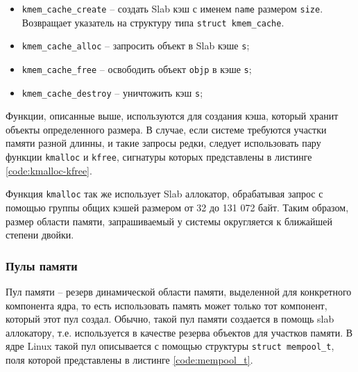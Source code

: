 \begin{itemize}
	\item \texttt{kmem\_cache\_create} -- создать Slab кэш с именем \texttt{name} размером \texttt{size}. Возвращает указатель на структуру типа \texttt{struct kmem\_cache}.
	\item \texttt{kmem\_cache\_alloc} -- запросить объект в Slab кэше \texttt{s};
	\item \texttt{kmem\_cache\_free} -- освободить объект \texttt{objp} в кэше \texttt{s};
	\item \texttt{kmem\_cache\_destroy} -- уничтожить кэш \texttt{s};
\end{itemize}

Функции, описанные выше, используются для создания кэша, который хранит объекты определенного размера. В случае, если системе требуются участки памяти разной длинны, и такие запросы редки, следует использовать пару функции \texttt{kmalloc} и  \texttt{kfree}, сигнатуры которых представлены в листинге \ref{code:kmalloc-kfree}. 


Функция \texttt{kmalloc} так же использует Slab аллокатор, обрабатывая запрос с помощью группы общих кэшей размером от 32 до 131 072 байт. Таким образом, размер области памяти, запрашиваемый у системы округляется к ближайшей степени двойки.

\subsubsection{Пулы памяти}

Пул памяти -- резерв динамической области памяти, выделенной для конкретного компонента ядра, то есть использовать память может только тот компонент, который этот пул создал. Обычно, такой пул памяти создается в помощь slab аллокатору, т.е. используется в качестве резерва объектов для участков памяти. В ядре Linux такой пул описывается с помощью структуры \texttt{struct mempool\_t}, поля которой представлены в листинге \ref{code:mempool_t}.

